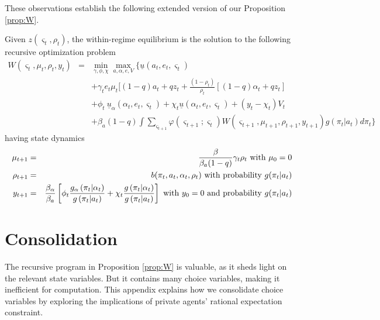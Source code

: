 \documentclass[12pt,letter,leqno]{article}
\theoremstyle{asn}
\theoremstyle{lem}
\theoremstyle{slem}
\theoremstyle{prop}
\theoremstyle{appprop}
\theoremstyle{rem}
\theoremstyle{defn}
\begin{document}
\begin{oldversion}
These observations establish the following extended version of our Proposition \ref{prop:W}.

\begin{proposition}
Given $z(\varsigma _{t},\rho _{t})$, the within-regime equilibrium is the
solution to the following recursive optimization problem%
\begin{eqnarray*}
W(\varsigma _{t},\mu _{t},\rho _{t},y_{t}) &=&\min_{\gamma ,\phi ,\chi
}\max_{a,\alpha ,e,V}\{ \underline{u}(a_{t},e_{t},\varsigma
_{t}) \\
&&+\gamma _{t}e_{t}\mu _{t}[(1-q)a_{t}+qz_{t}+\frac{(1-\rho
_{t})}{\rho _{t}}[(1-q)\alpha _{t}+qz_{t}] \\
&&+\phi _{t}~\underline{u}_{\alpha }(\alpha
_{t},e_{t},\varsigma _{t})+\chi _{t}
\underline{u}(\alpha _{t},e_{t},\varsigma _{t}
)+(y_{t}-\chi _{t})V_{t} \\
&&+\beta_{a}(1-q)\int \sum_{\varsigma _{t+1}}\varphi (\varsigma
_{t+1};\varsigma _{t})W(\varsigma _{t+1},\mu _{t+1},\rho
_{t+1},y_{t+1})g(\pi _{t}|a_{t})d\pi _{t}\}
\end{eqnarray*}%
having state dynamics%
\begin{eqnarray*}
\mu _{t+1} &=&\frac{\beta }{\beta_{a}(1-q)}\gamma _{t}\rho _{t}\text{ with }%
\mu _{0}=0 \\
\rho _{t+1} &=&b(\pi _{t},a_{t},\alpha _{t},\rho _{t})\text{ with
probability $g(\pi _{t}|a_{t})$} \\
y_{t+1} &=&\frac{\beta_{\alpha}}{\beta_{a}}\left[ \phi _{t}\frac{%
g_{\alpha }\left( \pi _{t}|\alpha _{t}\right) }{g\left( \pi
_{t}|a_{t}\right) }+\chi _{t}\frac{g\left( \pi _{t}|\alpha
_{t}\right) }{g\left( \pi _{t}|a_{t}\right) }\right] \text{ with }y_{0}=0%
\text{ and probability }g(\pi _{t}|a_{t})
\end{eqnarray*}
\end{proposition}

\end{oldversion}

\section{Consolidation}\label{appsec:consolidate}
 \renewcommand{\theequation}{B\arabic{equation}}
The recursive program in Proposition \ref{prop:W} is valuable, as it sheds light on the relevant state variables. But it contains many choice variables, making it inefficient for computation. This appendix explains how we consolidate choice variables by exploring the implications of private agents' rational expectation constraint. 
\end{document}
